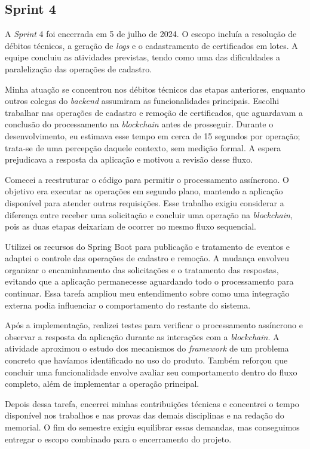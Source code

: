 \clearpage
\subsection{Sprint 4}

A \textit{Sprint} 4 foi encerrada em 5 de julho de 2024. O escopo incluía a resolução de débitos técnicos, a geração de \textit{logs} e o cadastramento de certificados em lotes. A equipe concluiu as atividades previstas, tendo como uma das dificuldades a paralelização das operações de cadastro.

Minha atuação se concentrou nos débitos técnicos das etapas anteriores, enquanto outros colegas do \textit{backend} assumiram as funcionalidades principais. Escolhi trabalhar nas operações de cadastro e remoção de certificados, que aguardavam a conclusão do processamento na \textit{blockchain} antes de prosseguir. Durante o desenvolvimento, eu estimava esse tempo em cerca de 15 segundos por operação; trata-se de uma percepção daquele contexto, sem medição formal. A espera prejudicava a resposta da aplicação e motivou a revisão desse fluxo.

Comecei a reestruturar o código para permitir o processamento assíncrono. O objetivo era executar as operações em segundo plano, mantendo a aplicação disponível para atender outras requisições. Esse trabalho exigiu considerar a diferença entre receber uma solicitação e concluir uma operação na \textit{blockchain}, pois as duas etapas deixariam de ocorrer no mesmo fluxo sequencial.

Utilizei os recursos do Spring Boot para publicação e tratamento de eventos e adaptei o controle das operações de cadastro e remoção. A mudança envolveu organizar o encaminhamento das solicitações e o tratamento das respostas, evitando que a aplicação permanecesse aguardando todo o processamento para continuar. Essa tarefa ampliou meu entendimento sobre como uma integração externa podia influenciar o comportamento do restante do sistema.

Após a implementação, realizei testes para verificar o processamento assíncrono e observar a resposta da aplicação durante as interações com a \textit{blockchain}. A atividade aproximou o estudo dos mecanismos do \textit{framework} de um problema concreto que havíamos identificado no uso do produto. Também reforçou que concluir uma funcionalidade envolve avaliar seu comportamento dentro do fluxo completo, além de implementar a operação principal.

Depois dessa tarefa, encerrei minhas contribuições técnicas e concentrei o tempo disponível nos trabalhos e nas provas das demais disciplinas e na redação do memorial. O fim do semestre exigiu equilibrar essas demandas, mas conseguimos entregar o escopo combinado para o encerramento do projeto.

